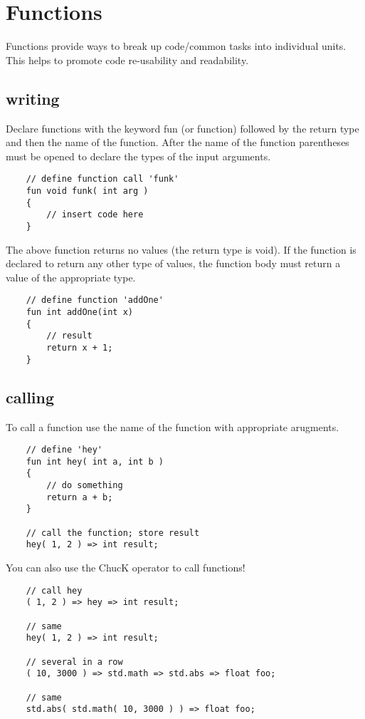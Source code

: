 \chapter{Functions}

Functions provide ways to break up code/common tasks into individual units. This helps to promote code re-usability and readability.

\section{writing}

Declare functions with the keyword fun (or  function) followed by the return type and then the name of the function. After the name of the function parentheses must be opened to declare the types of the input arguments.
\begin{verbatim}
    // define function call 'funk'
    fun void funk( int arg )
    {
        // insert code here
    }
\end{verbatim}

The above function returns no values (the return type is void). If the function is declared to return any other type of values, the function body must return a value of the appropriate type.
\begin{verbatim}
    // define function 'addOne'
    fun int addOne(int x)
    {
        // result
        return x + 1;
    }
\end{verbatim}
 
\section{calling}

To call a function use the name of the function with appropriate arugments.
\begin{verbatim}
    // define 'hey'
    fun int hey( int a, int b )
    {
        // do something
        return a + b;
    }

    // call the function; store result
    hey( 1, 2 ) => int result;
\end{verbatim}

You can also use the ChucK operator to call functions!
\begin{verbatim}
    // call hey
    ( 1, 2 ) => hey => int result;

    // same
    hey( 1, 2 ) => int result;

    // several in a row
    ( 10, 3000 ) => std.math => std.abs => float foo;

    // same
    std.abs( std.math( 10, 3000 ) ) => float foo;
\end{verbatim}
 
